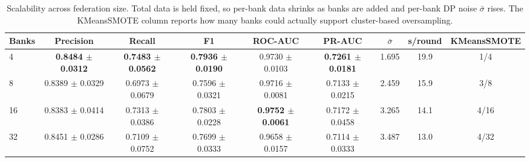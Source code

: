 \begin{table}[htbp]
\centering
\caption{Scalability across federation size. Total data is held fixed, so per-bank data shrinks as banks are added and per-bank DP noise $\bar{\sigma}$ rises. The KMeansSMOTE column reports how many banks could actually support cluster-based oversampling.}
\label{tab:scaling}
\begin{tabular}{lcccccccc}
\toprule
Banks & Precision & Recall & F1 & ROC-AUC & PR-AUC & $\bar{\sigma}$ & s/round & KMeansSMOTE \\
\midrule
4 & \textbf{0.8484 $\pm$ 0.0312} & \textbf{0.7483 $\pm$ 0.0562} & \textbf{0.7936 $\pm$ 0.0190} & 0.9730 $\pm$ 0.0103 & \textbf{0.7261 $\pm$ 0.0181} & 1.695 & 19.9 & 1/4 \\
8 & 0.8389 $\pm$ 0.0329 & 0.6973 $\pm$ 0.0679 & 0.7596 $\pm$ 0.0321 & 0.9716 $\pm$ 0.0081 & 0.7133 $\pm$ 0.0215 & 2.459 & 15.9 & 3/8 \\
16 & 0.8383 $\pm$ 0.0414 & 0.7313 $\pm$ 0.0386 & 0.7803 $\pm$ 0.0228 & \textbf{0.9752 $\pm$ 0.0061} & 0.7172 $\pm$ 0.0458 & 3.265 & 14.1 & 4/16 \\
32 & 0.8451 $\pm$ 0.0286 & 0.7109 $\pm$ 0.0752 & 0.7699 $\pm$ 0.0333 & 0.9658 $\pm$ 0.0157 & 0.7114 $\pm$ 0.0333 & 3.487 & 13.0 & 4/32 \\
\bottomrule
\end{tabular}
\end{table}